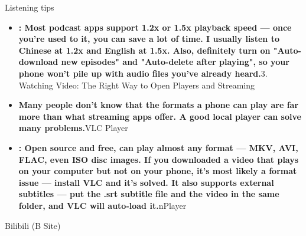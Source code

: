 
Listening tips

\begin{itemize}
  \item \textbf{: Most podcast apps support 1.2x or 1.5x playback speed — once you're used to it, you can save a lot of time. I usually listen to Chinese at 1.2x and English at 1.5x. Also, definitely turn on "Auto-download new episodes" and "Auto-delete after playing", so your phone won't pile up with audio files you've already heard.}3. Watching Video: The Right Way to Open Players and Streaming
  \item \textbf{Many people don't know that the formats a phone can play are far more than what streaming apps offer. A good local player can solve many problems.}VLC Player
  \item \textbf{: Open source and free, can play almost any format — MKV, AVI, FLAC, even ISO disc images. If you downloaded a video that plays on your computer but not on your phone, it's most likely a format issue — install VLC and it's solved. It also supports external subtitles — put the .srt subtitle file and the video in the same folder, and VLC will auto-load it.}nPlayer
\end{itemize}


Bilibili (B Site)

